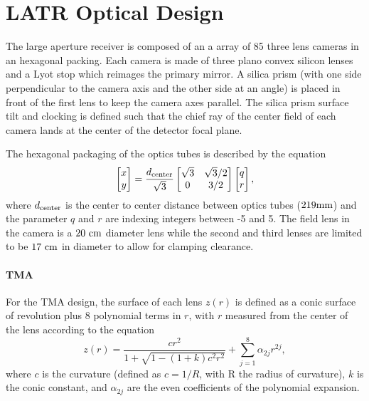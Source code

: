 \documentclass{article}
\begin{document}
\section{LATR Optical Design}

The large aperture receiver is composed of an a array of 85 three lens cameras in an hexagonal packing. Each camera is made of three plano convex silicon lenses and a Lyot stop which reimages the primary mirror. A silica prism (with one side perpendicular to the camera axis and the other side at an angle) is placed in front of the first lens to keep the camera axes parallel. The silica prism surface tilt and clocking is defined such that the chief ray of the center field of each camera lands at the center of the detector focal plane. 


The hexagonal packaging of the optics tubes is described by the equation \begin{equation}
\begin{bmatrix}x \\ y\end{bmatrix} = \frac{d_{\rm center}}{\sqrt{3}} \begin{bmatrix} \sqrt{3} & \sqrt{3}/2 \\ 0 & 3/2 \end{bmatrix} \begin{bmatrix}q \\ r\end{bmatrix},
\end{equation} where $d_{\rm center}$ is the center to center distance between optics tubes ($219 \rm mm$) and the parameter $q$ and $r$ are indexing integers between -5 and 5. The field lens in the camera is a $20~\rm cm$ diameter lens while the second and third lenses are limited to be $17~\rm cm$ in diameter to allow for clamping clearance. 

\paragraph{TMA}

For the TMA design, the surface of each lens $z(r)$ is defined as a conic surface of revolution plus 8 polynomial terms in $r$, with $r$ measured from the center of the lens according to the equation\begin{equation}
	z(r) = \frac{cr^2}{1+\sqrt{1-(1+k)c^2r^2}} + \sum_{j=1}^{8} \alpha_{2j} r^{2j}, 
\end{equation}
where $c$ is the curvature (defined as $c=1/R$, with R the radius of curvature), $k$ is the conic constant, and $\alpha_{2j}$ are the even coefficients of the polynomial expansion. 
\end{document}
